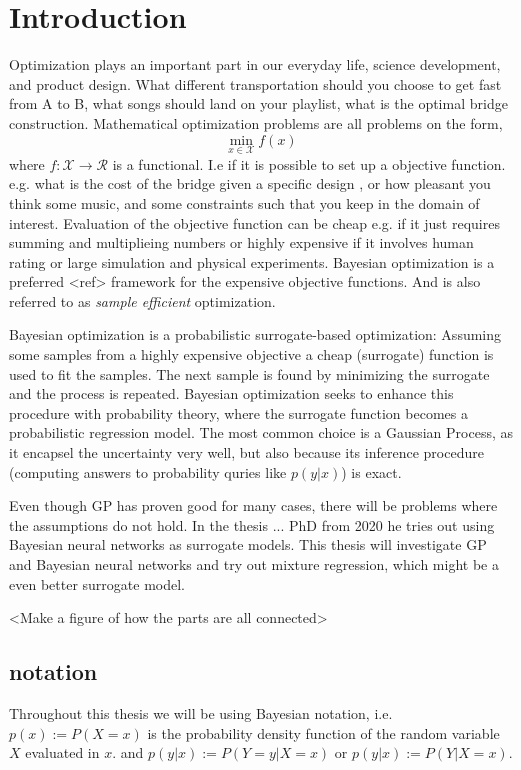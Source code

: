 \chapter{Introduction}

Optimization plays an important part in our everyday life, science development, and product design.
What different transportation should you choose to get fast from A to B, what songs should
land on your playlist, what is the optimal bridge construction. Mathematical optimization problems 
are all problems on the form, 
$$\min_{x\in \mathcal{X}} f(x)$$
where $f: \mathcal{X} \rightarrow \mathcal{R}$ is a functional. I.e if it is possible to set up
a objective function. e.g. what is the cost of the bridge given a specific design
, or how pleasant you think some music, and some constraints such that you keep in the domain of
interest. Evaluation of the objective function can be cheap e.g. if it just requires summing and 
multiplieing numbers or highly expensive if it involves human rating or large simulation and physical 
experiments. Bayesian optimization is a preferred <ref> framework for the expensive objective functions. 
And is also referred to as \textit{sample efficient} optimization. 

Bayesian optimization is a probabilistic surrogate-based optimization: Assuming some samples from a
highly expensive objective a cheap (surrogate) function is used to fit the samples. The next sample
is found by minimizing the surrogate and the process is repeated. Bayesian optimization seeks to
enhance this procedure with probability theory, where the surrogate function becomes a probabilistic
regression model. The most common choice is a Gaussian Process, as it encapsel the uncertainty very well,
but also because its inference procedure (computing answers to probability quries like $p(y|x)$) is exact.

Even though GP has proven good for many cases, there will be problems where the assumptions do not hold. 
In the thesis ... PhD from 2020 he tries out using Bayesian neural networks as surrogate models. 
This thesis will investigate GP and Bayesian neural networks and try out mixture regression, 
which might be a even better surrogate model. 

<Make a figure of how the parts are all connected>

\section{notation}
Throughout this thesis we will be using Bayesian notation, i.e. $p(x) := P(X=x)$ is 
the probability density function of the random variable $X$ evaluated in $x$. 
and $p(y|x) := P(Y=y|X=x)$ or $p(y|x) := P(Y|X=x)$.